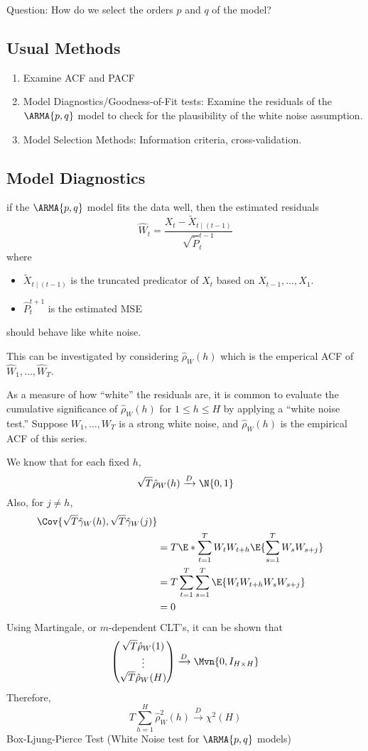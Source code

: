 Question: How do we select the orders $ p $ and $ q $ of the model?
\subsection*{Usual Methods}
\begin{enumerate}[(1)]
    \item Examine ACF and PACF
    \item Model Diagnostics/Goodness-of-Fit tests:
          Examine the residuals of the $ \ARMA{p,q} $ model to check for the plausibility
          of the white noise assumption.
    \item Model Selection Methods: Information criteria, cross-validation.
\end{enumerate}
\subsection*{Model Diagnostics}
if the $ \ARMA{p,q} $ model fits the data well, then the estimated residuals
\[ \hat{W}_{t}=\frac{X_t-\tilde{X}_{t\mid (t-1)}}{\sqrt{\tilde{P}}_{t}^{t-1}}  \]
where
\begin{itemize}
    \item $ \tilde{X}_{t\mid(t-1)} $ is the truncated predicator of $ X_t $
          based on $ X_{t-1},\ldots,X_1 $.
    \item $ \hat{P}_t^{t+1} $ is the estimated MSE
\end{itemize}
should behave like white noise.

This can be investigated by considering
$ \hat{\rho}_W(h) $
which is the emperical ACF of $ \hat{W}_1,\ldots,\hat{W}_T $.

As a measure of how ``white'' the residuals are, it is common
to evaluate the cumulative significance of $ \hat{\rho}_W(h) $
for $ 1\le h\le H $ by applying a ``white noise test.''
Suppose $ W_1,\ldots,W_T $ is a strong white noise, and
$ \hat{\rho}_W(h) $ is the empirical ACF of this series.

We know that for each fixed $ h $,
\[ \sqrt{T}\hat{\rho}_W(h)\xrightarrow{D}\N{0,1} \]
Also, for $ j\ne h $,
\begin{align*}
    \Cov{\sqrt{T}\hat{\gamma}_W(h),\sqrt{T}\hat{\gamma}_W(j)}          \\
     & =T\E*{\sum_{t=1}^{T} W_t W_{t+h}}\E{\sum_{s=1}^{T} W_s W_{s+j}} \\
     & =T \sum_{t=1}^{T} \sum_{s=1}^{T} \E{W_{t}W_{t+h}W_{s}W_{s+j}}   \\
     & =0
\end{align*}
Using Martingale, or $ m $-dependent CLT's, it can be shown that
\[ \begin{pmatrix}
        \sqrt{T}\hat{\rho}_W(1) \\
        \vdots                  \\
        \sqrt{T}\hat{\rho}_W(H)
    \end{pmatrix}
    \xrightarrow{D} \Mvn{0,I_{H\times H}} \]
Therefore,
\[ T \sum_{h=1}^{H} \hat{\rho}_W^2(h)
    \xrightarrow{D}\chi^2(H) \]
Box-Ljung-Pierce Test (White Noise test for $ \ARMA{p,q} $ models)

